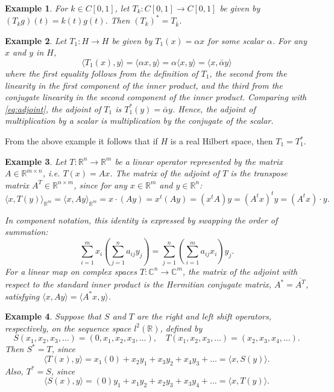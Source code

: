 \documentclass{report}
\newtheorem{exm}{Example}
\begin{document}
\begin{exm}
For $k \in C[0,1]$, let $T_{k}: C[0,1] \rightarrow C[0,1]$ be given by $(T_{k}g)(t)=k(t) g(t)$.
Then $\left(T_{k}\right)^{*}=T_{\bar{k}}$.
\end{exm}

\begin{exm}
Let $T_1:H \rightarrow H$ be given by $T_1(x) = \alpha x$ for some scalar $\alpha$. For any $x$ and $y$ in $H$,
$$
\langle T_1(x), y \rangle = \langle \alpha x, y \rangle = \alpha \langle x, y \rangle = \langle x, \bar{\alpha} y \rangle
$$
where the first equality follows from the definition of $T_1$, the second from the linearity in the first component of the inner product, and the third from the conjugate linearity in the second component of the inner product. Comparing with \eqref{eq:adjoint}, the adjoint of $T_1$ is $T_1^{*}(y) = \bar{\alpha}y$. Hence, the adjoint of multiplication by a scalar is multiplication by the conjugate of the scalar.
\end{exm}

From the above example it follows that if $H$ is a real Hilbert space, then $T_1= T_1^{*}$.


\begin{exm}
    Let $T: \mathbb{R}^{n} \to \mathbb{R}^{m}$ be a linear operator represented by the matrix $A \in \mathbb{R}^{m \times n}$, i.e. $T(x)=Ax$. The matrix of the adjoint of $T$ is the transpose matrix $A^{T} \in \mathbb{R}^{n \times m}$, since for any $x \in \mathbb{R}^{m}$ and $y \in \mathbb{R}^{n}$:
    $$\langle  x, T(y) \rangle_{\mathbb{R}^{m}} = \langle  x, Ay \rangle_{\mathbb{R}^{m}} = x \cdot (Ay) = x^t (Ay) = (x^t A) y = (A^t x)^t y = (A^{t}x) \cdot y.$$ 


    In component notation, this identity is expressed by swapping the order of summation:  %
    $$ %
    \sum_{i=1}^{m} x_{i} \left( \sum_{j=1}^{n} a_{ij}y_{j} \right) = \sum_{j=1}^{n} \left( \sum_{i=1}^{m} a_{ij}x_{i} \right) y_{j}. %
    $$ %
    For a linear map on complex spaces $T: \mathbb{C}^{n} \to \mathbb{C}^{m}$, the matrix of the adjoint with respect to the standard inner product is the Hermitian conjugate matrix, $A^{*} = \overline{A^{T}}$, satisfying $\langle x, Ay \rangle = \langle A^* x, y \rangle$. %
\end{exm}

\begin{exm} \label{ShiftOp}
Suppose that $S$ and $T$ are the right and left shift operators, respectively, on the sequence space $l^{2}(\mathbb{R})$, defined by
$$
S(x_{1}, x_{2}, x_{3}, \dots) = (0, x_{1}, x_{2}, x_{3}, \dots), \quad T(x_{1}, x_{2}, x_{3}, \dots) = (x_{2}, x_{3}, x_{4}, \dots).
$$
Then $S^{*}=T$, since
$$
\langle T(x), y \rangle = x_{1}(0) + x_{2}{y_{1}} + x_{3}{y_{2}} + x_{4}{y_{3}} + \dots = \langle x, S(y) \rangle.
$$
Also, $T^{*}=S$, since
$$
\langle S(x), y \rangle = (0)y_{1} + x_{1}{y_{2}} + x_{2}{y_{3}} + x_{3}{y_{4}} + \dots = \langle x, T(y) \rangle.
$$
\end{exm}
\end{document}
